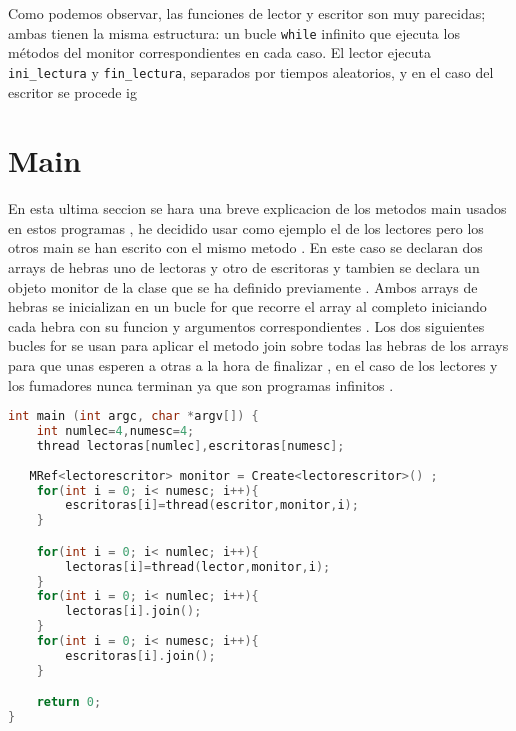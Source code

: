 \documentclass{article}
\begin{document}
Como podemos observar, las funciones de lector y escritor son muy parecidas; ambas tienen la misma estructura: un bucle \texttt{while} infinito que ejecuta los métodos del monitor correspondientes en cada caso. El lector ejecuta \texttt{ini\_lectura} y \texttt{fin\_lectura}, separados por tiempos aleatorios, y en el caso del escritor se procede ig

\section{Main}
En esta ultima seccion se hara una breve explicacion de los metodos main usados en estos programas , he decidido usar como ejemplo el de los lectores pero los otros main se han escrito con el mismo metodo  . En este caso se declaran dos arrays de hebras uno de lectoras y otro de escritoras y tambien se declara un objeto monitor de la clase que se ha definido previamente . Ambos arrays de hebras se inicializan en un bucle for que recorre el array al completo iniciando cada hebra con su funcion y argumentos correspondientes . 
Los dos siguientes bucles for se usan para aplicar el metodo join sobre todas las hebras de los arrays para que unas esperen a otras a la hora de finalizar , en el caso de los lectores y los fumadores  nunca terminan ya que son programas infinitos . 

\begin{lstlisting}[language=C++,caption=función main lectores ] 
int main (int argc, char *argv[]) {
	int numlec=4,numesc=4;
	thread lectoras[numlec],escritoras[numesc];
	
   MRef<lectorescritor> monitor = Create<lectorescritor>() ;	
	for(int i = 0; i< numesc; i++){
		escritoras[i]=thread(escritor,monitor,i);
	}	

	for(int i = 0; i< numlec; i++){
		lectoras[i]=thread(lector,monitor,i);
	}
	for(int i = 0; i< numlec; i++){
		lectoras[i].join();
	}
	for(int i = 0; i< numesc; i++){
		escritoras[i].join();
	}

	return 0;
}
\end{lstlisting}
\end{document}
